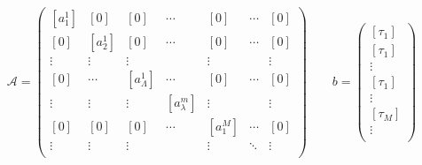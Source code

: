     \begin{equation}
        \label{matriceA}
	\mathcal{A} = 
	\begin{pmatrix}
    	[a^1_1]     &[0]        & [0]       & \cdots           & [0]       & \cdots    & [0] \\ 
		[0]			& [a^1_2] 	& [0] 		& \cdots           & [0]	   &\cdots     & [0] \\
            \vdots  	& \vdots	& \vdots	&  			       & \vdots    &  	       & \vdots	\\ 
		[0] 		& \cdots 	& [a^1_{\Lambda}] & \cdots     & [0]       &\cdots     & [0] \\
		\vdots  	& \vdots  	& \vdots  	&[a^m_{\lambda}]   & \vdots    &  		   & \vdots \\
		[0]  		& [0]  		& [0] 		& \cdots 	 	   & [a^M_1]   & \cdots    &[0] \\  
		\vdots  	& \vdots  	& \vdots    & 				   & \vdots    &  \ddots   & \vdots \\ 
		\end{pmatrix}
		\qquad b = 
		\begin{pmatrix}
			[\tau_1]\\ 
			[\tau_1]\\ 
			\vdots \\ 
			[\tau_1]\\ 
			\vdots \\ 
			[\tau_M]\\ 
			\vdots \\ 
		\end{pmatrix}
    \end{equation}